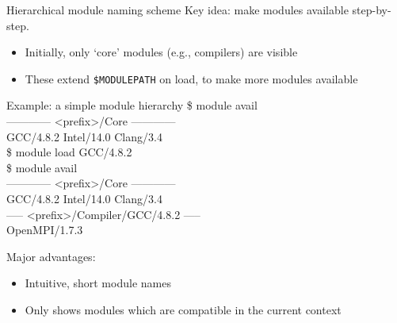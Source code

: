 \documentclass[10pt,xcolor={usenames,dvipsnames}]{beamer}
\begin{document}
\begin{frame}{Hierarchical module naming scheme}
    Key idea: make modules available step-by-step.
    \begin{itemize}
        \item
            Initially, only `core' modules (e.g., compilers) are visible
        \item
            These extend \texttt{\$MODULEPATH} on load, to make
            more modules available
    \end{itemize}
    \quad\quad
    \begin{minipage}{0.9\textwidth}
        \begin{exampleblock}{Example: a simple module hierarchy}
            \ttfamily
            \$ module avail\\
            ------------ <prefix>/Core ------------\\
            GCC/4.8.2 \quad Intel/14.0 \quad Clang/3.4\\
            \$ module load GCC/4.8.2\\
            \$ module avail\\
            ------------ <prefix>/Core ------------\\
            GCC/4.8.2 \quad Intel/14.0 \quad Clang/3.4\\
            ----- <prefix>/Compiler/GCC/4.8.2 -----\\
            OpenMPI/1.7.3
        \end{exampleblock}
    \end{minipage}

    \medskip
    Major advantages:
    \begin{itemize}
        \item
            Intuitive, short module names
        \item
            Only shows modules which are compatible in the current context
    \end{itemize}
\end{frame}

\end{document}
